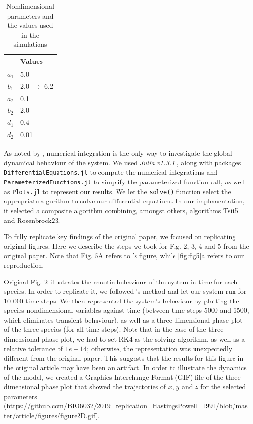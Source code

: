 \begin{table}[!htb]
  \centering
  \caption{Nondimensional parameters and the values used in the simulations}
  \label{tbl:table1}
  \begin{tabular}{c l}
    \hline
    & Values \\
    \hline
    $a_1$ & 5.0 \\
    $b_1$ & 2.0 $\rightarrow$ 6.2 \\
    $a_2$ & 0.1 \\
    $b_2$ & 2.0 \\
    $d_1$ & 0.4 \\
    $d_2$ & 0.01 \\
    \hline
  \end{tabular}
\end{table}

As noted by \citeauthor{hastings1991}, numerical integration is the only way to investigate the
global dynamical behaviour of the system.
We used \textit{Julia v1.3.1} \citep{bezanson2017}, along with packages \verb| DifferentialEquations.jl|
\citep{rackauckas2017} to compute the numerical integrations and \verb|ParameterizedFunctions.jl|
\citep{rackauckas2017} to simplify the parameterized function call, as well as \verb|Plots.jl| to represent
our results. We let the \verb|solve()| function select the appropriate algorithm to solve our
differential equations.
In our implementation, it selected a composite algorithm combining, amongst others,
algorithms Tsit5 and Rosenbrock23.

To fully replicate key findings of the original paper, we focused on replicating
original figures.
Here we describe the steps we took for Fig. 2, 3, 4 and 5 from the original paper.
Note that Fig. 5A refers to \citeauthor{hastings1991}'s figure, while \autoref{fig:fig5}a
refers to our reproduction.

Original Fig. 2 illustrates the chaotic behaviour of the system in time for each species.
In order to replicate it, we followed \citeauthor{hastings1991}'s method and let our system
run for 10 000 time steps.
We then represented the system's behaviour by plotting the species nondimensional
variables against time (between time steps 5000 and 6500, which eliminates transient
behaviour), as well as a three dimensional phase plot of the three species (for all time
steps). Note that in the case of the three dimensional phase plot, we had to set RK4 as
the solving algorithm, as well as a relative tolerance of $1e-14$; otherwise, the
representation was unexpectedly different from the original paper.
This suggests that the results for this figure in the original article may have been an
artifact.
In order to illustrate the dynamics of the model, we created a Graphics Interchange Format
(GIF) file of the three-dimensional phase plot that showed the trajectories of $x$, $y$
and $z$ for the selected parameters (\url{https://github.com/BIO6032/2019_replication_HastingsPowell_1991/blob/master/article/figures/figure2D.gif}).

